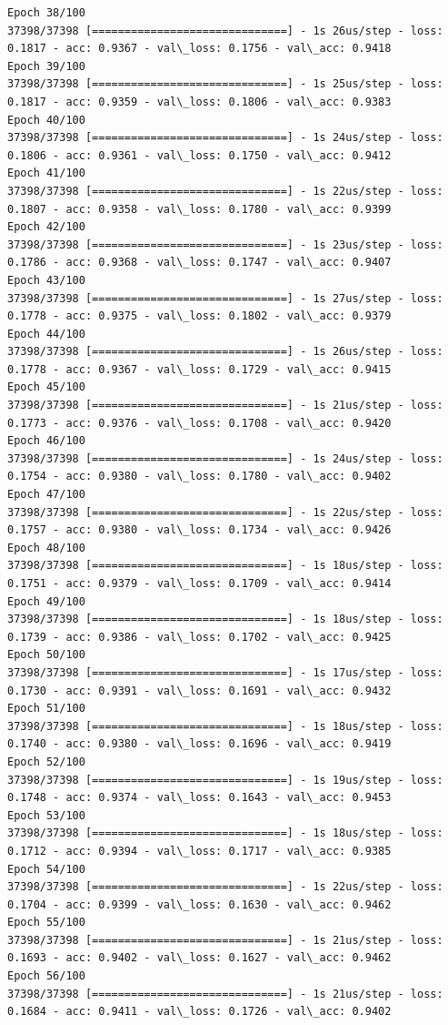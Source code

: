 \documentclass[11pt]{article}
\begin{document}
\begin{Verbatim}[commandchars=\\\{\}]
Epoch 38/100
37398/37398 [==============================] - 1s 26us/step - loss: 0.1817 - acc: 0.9367 - val\_loss: 0.1756 - val\_acc: 0.9418
Epoch 39/100
37398/37398 [==============================] - 1s 25us/step - loss: 0.1817 - acc: 0.9359 - val\_loss: 0.1806 - val\_acc: 0.9383
Epoch 40/100
37398/37398 [==============================] - 1s 24us/step - loss: 0.1806 - acc: 0.9361 - val\_loss: 0.1750 - val\_acc: 0.9412
Epoch 41/100
37398/37398 [==============================] - 1s 22us/step - loss: 0.1807 - acc: 0.9358 - val\_loss: 0.1780 - val\_acc: 0.9399
Epoch 42/100
37398/37398 [==============================] - 1s 23us/step - loss: 0.1786 - acc: 0.9368 - val\_loss: 0.1747 - val\_acc: 0.9407
Epoch 43/100
37398/37398 [==============================] - 1s 27us/step - loss: 0.1778 - acc: 0.9375 - val\_loss: 0.1802 - val\_acc: 0.9379
Epoch 44/100
37398/37398 [==============================] - 1s 26us/step - loss: 0.1778 - acc: 0.9367 - val\_loss: 0.1729 - val\_acc: 0.9415
Epoch 45/100
37398/37398 [==============================] - 1s 21us/step - loss: 0.1773 - acc: 0.9376 - val\_loss: 0.1708 - val\_acc: 0.9420
Epoch 46/100
37398/37398 [==============================] - 1s 24us/step - loss: 0.1754 - acc: 0.9380 - val\_loss: 0.1780 - val\_acc: 0.9402
Epoch 47/100
37398/37398 [==============================] - 1s 22us/step - loss: 0.1757 - acc: 0.9380 - val\_loss: 0.1734 - val\_acc: 0.9426
Epoch 48/100
37398/37398 [==============================] - 1s 18us/step - loss: 0.1751 - acc: 0.9379 - val\_loss: 0.1709 - val\_acc: 0.9414
Epoch 49/100
37398/37398 [==============================] - 1s 18us/step - loss: 0.1739 - acc: 0.9386 - val\_loss: 0.1702 - val\_acc: 0.9425
Epoch 50/100
37398/37398 [==============================] - 1s 17us/step - loss: 0.1730 - acc: 0.9391 - val\_loss: 0.1691 - val\_acc: 0.9432
Epoch 51/100
37398/37398 [==============================] - 1s 18us/step - loss: 0.1740 - acc: 0.9380 - val\_loss: 0.1696 - val\_acc: 0.9419
Epoch 52/100
37398/37398 [==============================] - 1s 19us/step - loss: 0.1748 - acc: 0.9374 - val\_loss: 0.1643 - val\_acc: 0.9453
Epoch 53/100
37398/37398 [==============================] - 1s 18us/step - loss: 0.1712 - acc: 0.9394 - val\_loss: 0.1717 - val\_acc: 0.9385
Epoch 54/100
37398/37398 [==============================] - 1s 22us/step - loss: 0.1704 - acc: 0.9399 - val\_loss: 0.1630 - val\_acc: 0.9462
Epoch 55/100
37398/37398 [==============================] - 1s 21us/step - loss: 0.1693 - acc: 0.9402 - val\_loss: 0.1627 - val\_acc: 0.9462
Epoch 56/100
37398/37398 [==============================] - 1s 21us/step - loss: 0.1684 - acc: 0.9411 - val\_loss: 0.1726 - val\_acc: 0.9402

\end{Verbatim}
\end{document}
